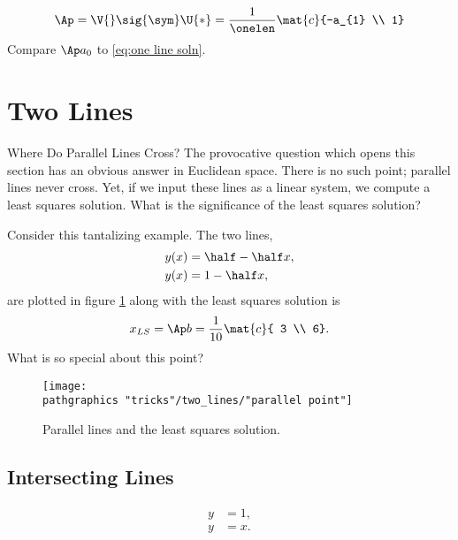   \begin{equation*}   %
      \Ap = \V{} \sig{\sym} \U{*} = \frac{1} {\onelen} \mat{c}{-a_{1} \\ 1}
  \end{equation*}
Compare $\Ap a_{0}$ to \eqref{eq:one line soln}.

\section{Two Lines}  %
Where Do Parallel Lines Cross? The provocative question which opens this section has an obvious answer in Euclidean space. There is no such point; parallel lines never cross. Yet, if we input these lines as a linear system, we compute a least squares solution. What is the significance of the least squares solution?

Consider this tantalizing example. The two lines,
  \begin{equation*}   %
    \begin{split}
      y(x) &= \half - \half x, \\
      y(x) &= 1 - \half x,
    \end{split}
  \end{equation*}
are plotted in figure \ref{fig:tantalizing} along with the least squares solution is 
  \begin{equation*}   %
      x_{LS} = \Ap b = \frac{1}{10}\mat{c}{ 3 \\ 6}.
  \end{equation*}
What is so special about this point?
\begin{figure}[htbp] %
   \centering
     \texttt{[image: \\pathgraphics "tricks"/two\_lines/"parallel point"]} 
   \caption{Parallel lines and the least squares solution.}
   \label{fig:tantalizing}
\end{figure}

\subsection{Intersecting Lines}
  \begin{equation*}   %
   \begin{split}
      y &= 1, \\
      y &= x .
   \end{split}
  \end{equation*}

